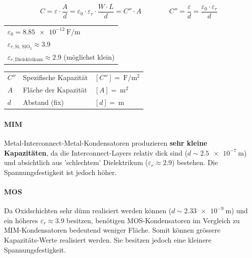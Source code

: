 $$ \boxed{ C = \varepsilon \cdot  \frac{A}{d} = \varepsilon_0 \cdot \varepsilon_r \cdot \frac{W \cdot L}{d} =  C'' \cdot A } \qquad \qquad
    \boxed{ C'' = \frac{\varepsilon}{d} = \frac{\varepsilon_0 \cdot \varepsilon_r}{d} } $$

\begin{minipage}[t]{0.44\columnwidth}
    \begin{tabular}{l@{}}
        $\varepsilon_0 = \qty{8.85e-12}{\farad\per\meter}$                      \\
        $\varepsilon_{r, \text{Si, SiO$_2$}} \approx 3.9$                       \\
        $\varepsilon_{r, \text{Dielektrikum}} \approx 2.9$ (möglichst klein)   
    \end{tabular}   
\end{minipage}
\hfill
\begin{minipage}[t]{0.55\columnwidth}
    \begin{tabular}{lll@{}}
        $C''$   & Spezifische Kapazität & $[C''] = \qty{}{\farad\per\square\meter}$ \\
        $A$     & Fläche der Kapazität  & $[A] = \qty{}{\square\meter}$             \\
        $d$     & Abstand (fix)         & $[d] = \qty{}{\meter}$
    \end{tabular}
\end{minipage}



\paragraph{MIM}
Metal-Interconnect-Metal-Kondensatoren produzieren \textbf{sehr kleine Kapazitäten}, da die Interconnect-Layers relativ dick sind ($d \sim \qty{2.5e-7}{\meter}$) und absichtlich aus 'schlechtem' Dielektrikum ($\varepsilon_r \approx 2.9$) bestehen.
Die Spannungsfestigkeit ist jedoch höher.

\paragraph{MOS}
Da Oxidschichten sehr dünn realisiert werden können ($d \sim \qty{2.33e-9}{\meter}$) und ein höheres $\varepsilon_r \approx 3.9$ besitzen, benötigen MOS-Kondensatoren im Vergleich zu MIM-Kondensatoren bedeutend weniger Fläche.
Somit können grössere Kapazitäts-Werte realisiert werden.
Sie besitzen jedoch eine kleinere Spannungsfestigkeit.


